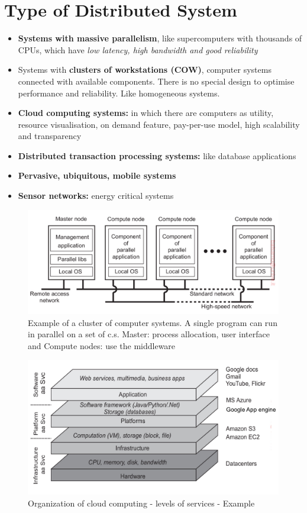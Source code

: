     
\section{Type of Distributed System}
\begin{itemize}
    \item \textbf{Systems with massive parallelism}, like supercomputers with thousands of CPUs, which have \textit{low latency, high bandwidth and good reliability}
    \item Systems with \textbf{clusters of workstations (COW)}, computer systems connected with available components. There is  no special design to optimise performance and reliability. Like homogeneous systems.
    \item \textbf{Cloud computing systems:} in which there are computers as utility, resource visualisation, on demand feature, pay-per-use model, high scalability and transparency
    \item \textbf{Distributed transaction processing systems:} like database applications
    \item \textbf{Pervasive, ubiquitous, mobile systems}
    \item \textbf{Sensor networks:} energy critical systems
\end{itemize}
\begin{figure}[!h]
            \centering
            \includegraphics[width=.7\linewidth]{images/distributedSystem/typeOfDS.jpeg}
            \caption{Example of a cluster of computer systems. A single program can run in parallel on a set of c.s.
Master: process allocation, user interface and Compute nodes: use the middleware 
}
    \end{figure}
    
\begin{figure}[!ht]
            \centering
            \includegraphics[width=.7\linewidth]{images/distributedSystem/CCdefinition.jpeg}
            \caption{Organization of cloud computing - levels of services - Example
}
    \end{figure}
    
